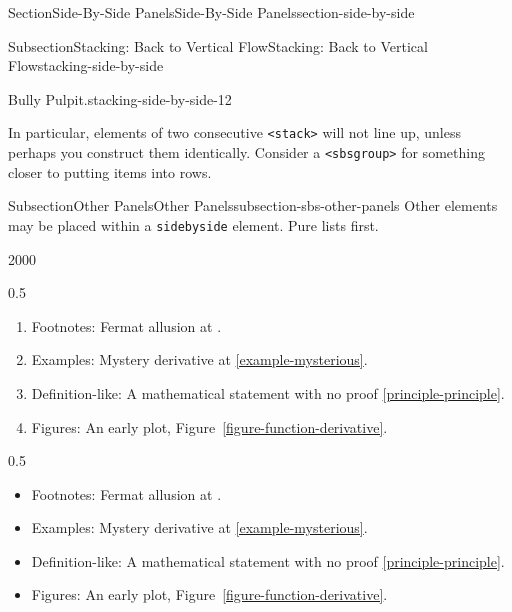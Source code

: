 \documentclass[twoside,10pt,]{article}
\newcommand{\xreffont}{\relax}
\newcommand{\mono}[1]{\texttt{#1}}
\numberwithin{equation}{section}
\begin{document}
\begin{sectionptx}{Section}{Side-By-Side Panels}{}{Side-By-Side Panels}{}{}{section-side-by-side}
\begin{subsectionptx}{Subsection}{Stacking: Back to Vertical Flow}{}{Stacking: Back to Vertical Flow}{}{}{stacking-side-by-side}
\begin{paragraphs}{Bully Pulpit.}{stacking-side-by-side-12}
\par
In particular, elements of two consecutive \mono{<stack>} will not line up, unless perhaps you construct them identically.  Consider a \mono{<sbsgroup>} for something closer to putting items into rows.%
\end{paragraphs}%
\end{subsectionptx}
%
%
\typeout{************************************************}
\typeout{************************************************}
%
\begin{subsectionptx}{Subsection}{Other Panels}{}{Other Panels}{}{}{subsection-sbs-other-panels}
Other elements may be placed within a \mono{sidebyside} element.  Pure lists first.%
\begin{sidebyside}{2}{0}{0}{0}%
\begin{sbspanel}{0.5}%
%
\begin{enumerate}
\item{}Footnotes: Fermat allusion at \hyperref[footnote-fermat]{{\xreffont 2.1}}.%
\item{}Examples: Mystery derivative at \hyperref[example-mysterious]{{\xreffont\ref{example-mysterious}}}.%
\item{}Definition-like: A mathematical statement with no proof \hyperref[principle-principle]{{\xreffont\ref{principle-principle}}}.%
\item{}Figures: An early plot, Figure~\hyperref[figure-function-derivative]{{\xreffont\ref{figure-function-derivative}}}.%
\end{enumerate}
\end{sbspanel}%
\begin{sbspanel}{0.5}%
%
\begin{itemize}[label=\textbullet]
\item{}Footnotes: Fermat allusion at \hyperref[footnote-fermat]{{\xreffont 2.1}}.%
\item{}Examples: Mystery derivative at \hyperref[example-mysterious]{{\xreffont\ref{example-mysterious}}}.%
\item{}Definition-like: A mathematical statement with no proof \hyperref[principle-principle]{{\xreffont\ref{principle-principle}}}.%
\item{}Figures: An early plot, Figure~\hyperref[figure-function-derivative]{{\xreffont\ref{figure-function-derivative}}}.%
\end{itemize}
\end{sbspanel}%
\end{sidebyside}%
\par

\end{subsectionptx}
\end{sectionptx}
\end{document}
